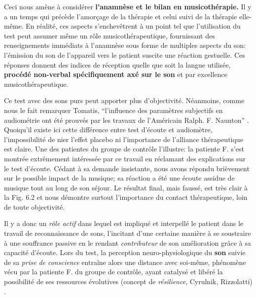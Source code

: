 \begin{itemize}
 
 Ceci nous amène à considérer \textbf{ l'anamnèse et le bilan en musicothérapie.}
 Il y a un temps qui
 précède
 l'amorçage de la thérapie et celui suivi de la thérapie elle-même.
 En réalité, ces aspects s'enchevêtrent à un point tel que
 l'utilisation du test peut assumer même un rôle musicothérapeutique, fournissant des
 renseignements immédiats à l'anamnèse sous forme de multiples
 aspects du son: l'émission du son de
 l'appareil vers le patient suscite une  réaction gestuelle.  Ces réponses  
 donnent des indices de réception %
 quelle que soit la langue utilisée,\textbf{ procédé non-verbal
 	spécifiquement axé sur le son} et par excellence musicothérapeutique. 
 
Ce test avec des sons purs peut apporter plus d'objectivité. Néanmoins, comme nous le fait remarquer 
Tomatis,
\enquote{l'influence des paramètres subjectifs en audiométrie ont été prouvés par les travaux de 
	l'Américain Ralph. F. Naunton}  \autocite [69]{tomatisoreilletvie}. Quoiqu'il existe ici cette différence 
entre 
test d'écoute et audiomètre,
l'impossibilité  de nier l'effet placebo ni l'importance de  
l'alliance 
thérapeutique est claire.
 Une des patientes du groupe de contrôle l'illustre: la patiente F. 
s'est  montrée extrêmement intéressée par ce travail en réclamant des explications sur le test d'écoute. 
Cédant à sa demande insistante, nous avons répondu brièvement 
sur le possible impact de la musique; sa réaction a été une écoute assidue de musique  tout au 
long de son séjour. Le résultat final, mais faussé, est très clair à la Fig. 6.2  et nous 
démontre 
surtout l'importance du contact thérapeutique, loin de toute objectivité.

 Il y a donc un  \emph{rôle actif} dans lequel est impliqué et interpellé le patient dans le travail
 de reconnaissance de sons, l'incitant d'une certaine manière  à se soustraire à une souffrance
 passive en  le rendant  \textit{contributeur} de son amélioration grâce à sa capacité
 d'écoute.
  Lors du test, la perception
 neuro-physiologique du \textbf{son} suivie de sa
 \textit{prise de conscience }
 entraîne alors une distance avec
 soi-même, phénomène vécu  par 
 la  patiente F.  du groupe de contrôle, ayant catalysé et libéré
 la possibilité de ses ressources évolutives (concept de \textit{résilience}, Cyrulnik, Rizzolatti) 
 \autocite[27--63]{van_eersel_cerveau}.
 

\end{itemize}
